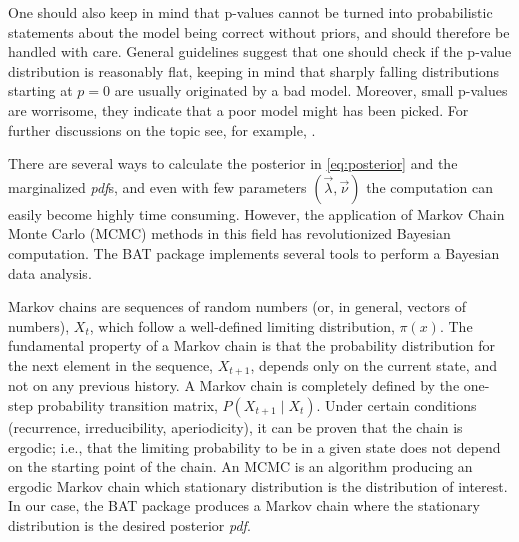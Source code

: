 One should also keep in mind that p-values cannot be turned into probabilistic statements about the model being correct without priors, and should therefore be handled with care. General guidelines suggest that one should check if the p-value distribution is reasonably flat, keeping in mind that sharply falling distributions starting at $p=0$ are usually originated by a bad model. Moreover, small p-values are worrisome, they indicate that a poor model might has been picked. For further discussions on the topic see, for example, \cite{p-value}.

 There are several ways to calculate the posterior in \ref{eq:posterior} and the marginalized \emph{pdf}s, and even with few parameters $(\vec{\lambda},\vec{\nu})$ the computation can easily become highly time consuming. However, the application of Markov Chain Monte Carlo (MCMC) methods in this field has revolutionized Bayesian computation. The BAT package \cite{BAT} implements several tools to perform a Bayesian data analysis.

Markov chains are sequences of random numbers (or, in general, vectors of numbers), $X_t$, which follow a well-defined limiting distribution, $\pi(x)$. The fundamental property of a Markov chain is that the probability distribution for the next element in the sequence, $X_{t+1}$, depends only on the current state, and not on any previous history. A Markov chain is completely defined by the one-step probability transition matrix, $P(X_{t+1}\mid X_t)$. Under certain conditions (recurrence, irreducibility, aperiodicity), it can be proven that the chain is ergodic; i.e., that the limiting probability to be in a given state does not depend on the starting point of the chain. An MCMC is an algorithm producing an ergodic Markov chain which stationary distribution is the distribution of interest. In our case, the BAT package produces a Markov chain where the stationary distribution is the desired posterior \emph{pdf}.

